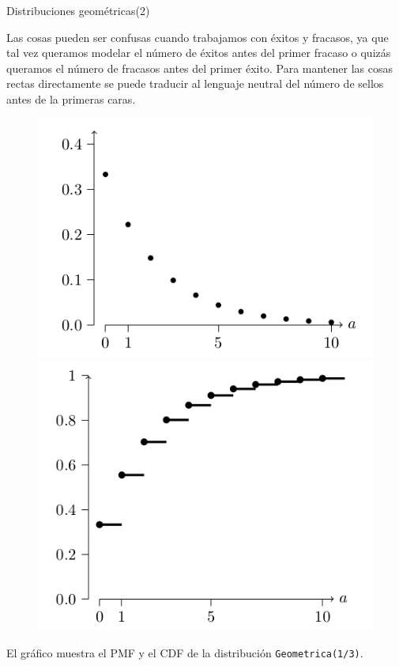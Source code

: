 \documentclass[10pt]{beamer}
\begin{document}
\begin{frame}{Distribuciones geom\'etricas(2)}
\small{Las cosas pueden ser confusas cuando trabajamos con \'exitos y fracasos, ya que tal vez queramos modelar el n\'umero de \'exitos antes del primer fracaso o quiz\'as queramos el n\'umero de fracasos antes del primer \'exito. Para mantener las cosas rectas directamente se puede traducir al lenguaje neutral del n\'umero de sellos antes de la primeras caras.
		
\begin{figure}
	\centering
	\begin{minipage}{.5\textwidth}
		\centering
		\includegraphics[width=0.7\linewidth]{v16}
	\end{minipage}%
	\begin{minipage}{.5\textwidth}
		\centering
		\includegraphics[width=0.7\linewidth]{v17}
	\end{minipage}
\end{figure}

El gr\'afico muestra el PMF y el CDF de la distribuci\'on \texttt{Geometrica(1/3)}.	
}
\end{frame}
\end{document}
